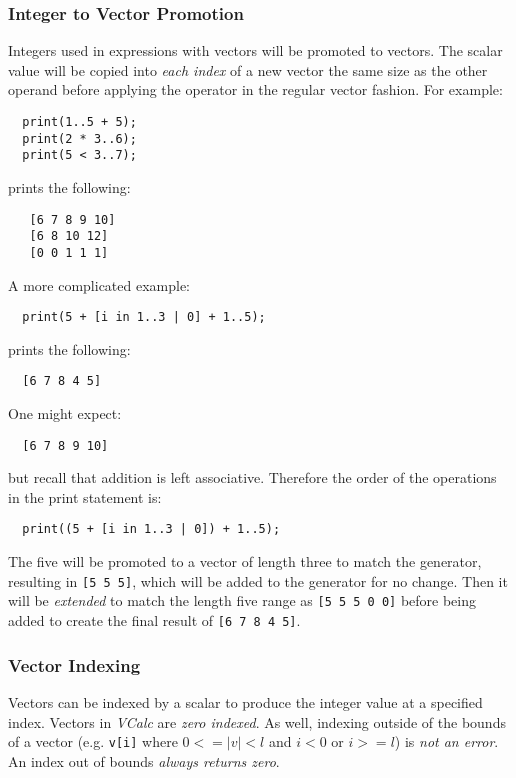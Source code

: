 \documentclass{article}
\newcommand{\code}[1]{\texttt{\textmd{#1}}}
\begin{document}
\subsubsection{Integer to Vector Promotion}
Integers used in expressions with vectors will be promoted to vectors. The scalar value will be
copied into \textit{each index} of a new vector the same size as the other operand before applying
the operator in the regular vector fashion. For example:
\begin{lstlisting}
  print(1..5 + 5);
  print(2 * 3..6);
  print(5 < 3..7);
\end{lstlisting}

 prints the following:
 \begin{lstlisting}
   [6 7 8 9 10]
   [6 8 10 12]
   [0 0 1 1 1]
 \end{lstlisting}

A more complicated example:
\begin{lstlisting}
  print(5 + [i in 1..3 | 0] + 1..5);
\end{lstlisting}

prints the following:
\begin{lstlisting}
  [6 7 8 4 5]
\end{lstlisting}

One might expect:
\begin{lstlisting}
  [6 7 8 9 10]
\end{lstlisting}

but recall that addition is left associative. Therefore the order of the operations in the print
statement is:
\begin{lstlisting}
  print((5 + [i in 1..3 | 0]) + 1..5);
\end{lstlisting}

The five will be promoted to a vector of length three to match the generator, resulting in
\code{[5 5 5]}, which will be added to the generator for no change. Then it will be
\textit{extended} to match the length five range as \code{[5 5 5 0 0]} before being added to create
the final result of \code{[6 7 8 4 5]}.

\subsubsection{Vector Indexing}
Vectors can be indexed by a scalar to produce the integer value at a specified index. Vectors in
\textit{VCalc} are \textit{zero indexed}. As well, indexing outside of the bounds of a vector (e.g.
\code{v[i]} where $ 0 <= |v| < l$ and $ i < 0 $ or $ i >= l$) is \textit{not an error}. An
index out of bounds \textit{always returns zero}.
\end{document}
